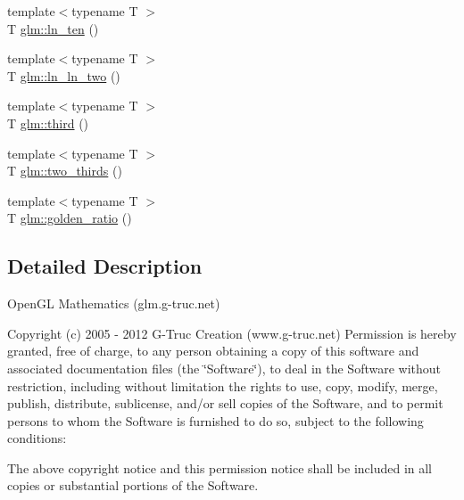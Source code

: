 \begin{DoxyCompactItemize}
{\footnotesize template$<$typename T $>$ }\\\-T \hyperlink{group__gtx__constants_ga7d986c61cc187475b1f33b031290aa9c}{glm\-::ln\-\_\-ten} ()
\item 
{\footnotesize template$<$typename T $>$ }\\\-T \hyperlink{group__gtx__constants_gada8ef9ab3605a4ce354e2fcc2abc3dc4}{glm\-::ln\-\_\-ln\-\_\-two} ()
\item 
{\footnotesize template$<$typename T $>$ }\\\-T \hyperlink{group__gtx__constants_gaf502fffabf5ab36d07c6c88123385b0b}{glm\-::third} ()
\item 
{\footnotesize template$<$typename T $>$ }\\\-T \hyperlink{group__gtx__constants_ga733f4fe089cba8f40ac0549928f88a51}{glm\-::two\-\_\-thirds} ()
\item 
{\footnotesize template$<$typename T $>$ }\\\-T \hyperlink{group__gtx__constants_gad32becbaf13758b9a2b3c985937254fe}{glm\-::golden\-\_\-ratio} ()
\end{DoxyCompactItemize}


\subsection{\-Detailed \-Description}
\-Open\-G\-L \-Mathematics (glm.\-g-\/truc.\-net)

\-Copyright (c) 2005 -\/ 2012 \-G-\/\-Truc \-Creation (www.\-g-\/truc.\-net) \-Permission is hereby granted, free of charge, to any person obtaining a copy of this software and associated documentation files (the \char`\"{}\-Software\char`\"{}), to deal in the \-Software without restriction, including without limitation the rights to use, copy, modify, merge, publish, distribute, sublicense, and/or sell copies of the \-Software, and to permit persons to whom the \-Software is furnished to do so, subject to the following conditions\-:

\-The above copyright notice and this permission notice shall be included in all copies or substantial portions of the \-Software.

